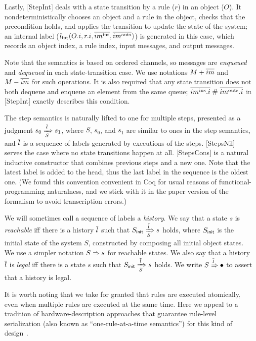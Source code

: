 \documentclass[sigplan,10pt,review,anonymous,screen]{acmart}\settopmatter{printfolios=true,printccs=false,printacmref=false}
\begin{document}
Lastly, [StepInt] deals with a state transition by a rule ($r$) in an object ($O$).
It nondeterministically chooses an object and a rule in the object, checks that the precondition holds, and applies the transition to update the state of the system; an internal label ($\lblInt{\idxOf{O}}{\idxOf{r}}{\msgIns{im}}{\msgOuts{im}}$) is generated in this case, which records an object index, a rule index, input messages, and output messages.

Note that the semantics is based on ordered channels, so messages are \emph{enqueued} and \emph{dequeued} in each state-transition case.
We use notations $\enqMsgs{M}{\listof{im}}$ and $\deqMsgs{M}{\listof{im}}$ for such operations.
It is also required that any state transition does not both dequeue and enqueue an element from the same queue; $\disj{\midxIns{im}}{\midxOuts{im}}$ in [StepInt] exactly describes this condition.

The step semantics is naturally lifted to one for multiple steps, presented as a judgment $\semsteps{S}{s_0}{\listof{l}}{s_1}$, where $S$, $s_0$, and $s_1$ are similar to ones in the step semantics, and $\listof{l}$ is a sequence of labels generated by executions of the steps.
[StepsNil] serves the case where no state transitions happen at all.
[StepsCons] is a natural inductive constructor that combines previous steps and a new one.
Note that the latest label is added to the head, thus the last label in the sequence is the oldest one.
(We found this convention convenient in Coq for usual reasons of functional-programming naturalness, and we stick with it in the paper version of the formalism to avoid transcription errors.)

We will sometimes call a sequence of labels a \emph{history}.
We say that a state $s$ is \emph{reachable} iff there is a history $\listof{l}$ such that $\semsteps{S}{\sysInit{S}}{\listof{l}}{s}$ holds, where $\sysInit{S}$ is the initial state of the system $S$, constructed by composing all initial object states.
We use a simpler notation $\semrch{S}{s}$ for reachable states.
We also say that a history $\listof{l}$ is \emph{legal} iff there is a state $s$ such that $\semsteps{S}{\sysInit{S}}{\listof{l}}{s}$ holds.
We write $\semleg{S}{\listof{l}}$ to assert that a history is legal.

It is worth noting that we take for granted that rules are executed atomically, even when multiple rules are executed at the same time.
Here we appeal to a tradition of hardware-description approaches that guarantee rule-level serialization (also known as ``one-rule-at-a-time semantics'') for this kind of design~\cite{fesi,kami,Murali:2015,Dave:2005,Dave:2007}.
\end{document}
